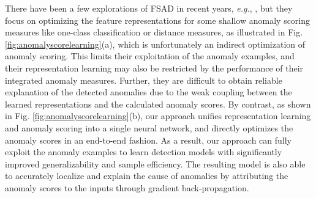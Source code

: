 \documentclass[10pt,journal,compsoc]{IEEEtran}
\newcommand{\eg}{\textit{e.g.}}
\begin{document}
There have been a few explorations of FSAD in recent years, \eg, \cite{pang2018repen,ruff2020deep}, but they focus on optimizing the feature representations for some shallow anomaly scoring measures like one-class classification or distance measures, as illustrated in Fig. \ref{fig:anomalyscorelearning}(a), which is unfortunately an indirect optimization of anomaly scoring. This limits their exploitation of the anomaly examples, and their representation learning may also be restricted by the performance of their integrated anomaly measures. Further, they are difficult to obtain reliable explanation of the detected anomalies due to the weak coupling between the learned representations and the calculated anomaly scores. By contrast, as shown in Fig. \ref{fig:anomalyscorelearning}(b), our approach unifies representation learning and anomaly scoring into a single neural network, and directly optimizes the anomaly scores in an end-to-end fashion. As a result, our approach can fully exploit the anomaly examples to learn detection models with significantly improved generalizability and sample efficiency. The resulting model is also able to accurately localize and explain the cause of anomalies by attributing the anomaly scores to the inputs through gradient back-propagation.
\end{document}
